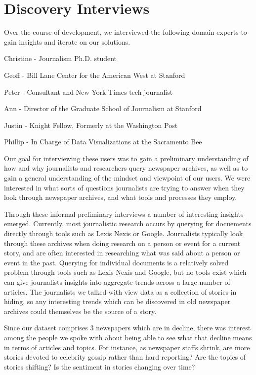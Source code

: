 \section{Discovery Interviews}

Over the course of development, we interviewed the following domain experts to gain insights and iterate on our solutions.
\begin{itemize*}
\item Christine - Journalism Ph.D. student
\item Geoff - Bill Lane Center for the American West at Stanford
\item Peter - Consultant and New York Times tech journalist
\item Ann - Director of the Graduate School of Journalism at Stanford
\item Justin - Knight Fellow, Formerly at the Washington Post
\item Phillip - In Charge of Data Visualizations at the Sacramento Bee
\end{itemize*}

Our goal for interviewing these users was to gain a preliminary understanding of how and why journalists and researchers query newspaper archives, as well as to gain a general understanding of the mindset and viewpoint of our users. 
We were interested in what sorts of questions journalists are trying to answer when they look through newspaper archives, and what tools and processes they employ.

Through these informal preliminary interviews a number of interesting insights emerged. Currently, most journalistic research occurs by querying for docuements directly through tools such as Lexis Nexis or Google. 
Journalists typically look through these archives when doing research on a person or event for a current story, and are often interested in researching what was said about a person or event in the past.
Querying for individual documents is a relatively solved problem through tools such as Lexis Nexis and Google, but no tools exist which can give journalists insights into aggregate trends across a large number of articles. 
The journalists we talked with view data as a collection of stories in hiding, so any interesting trends which can be discovered in old newspaper archives could themselves be the source of a story.

Since our dataset comprises 3 newspapers which are in decline, there was interest among the people we spoke with about being able to see what that decline means in terms of articles and topics. For instance, as newspaper staffs shrink, are more stories devoted to celebrity gossip rather than hard reporting? Are the topics of stories shifting? Is the sentiment in stories changing over time?

